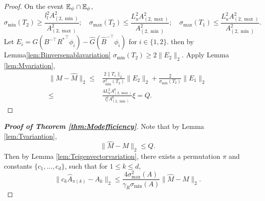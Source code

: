 \begin{proof}
On the event $\mathbb{E}_{\psi}\cap\mathbb{E}_{\phi}$,
\[
\sigma_{\min}(T_2) \ge \frac{l_l^2A^2_{(2,\min)}}{A^2_{(2,\max)}}; \quad \sigma_{\max}(T_2) \le \frac{L_u^2A^2_{(2,\max)}}{A^2_{(2,\min)}};  \quad \sigma_{\max}(T_1) \le \frac{L_u^2A^2_{(2,\max)}}{A^2_{(2,\min)}}. 
\]
Let $E_i = G(B^{-\top}{R^*}^{\top}\phi_i) - \widehat{G}(\widehat{B}^{-\top}\phi_i)$ for  $i\in\{1,2\}$. then by 
Lemma\ref{lem:Binversenablavariation} $\sigma_{\min}(T_2) \ge 2\|E_2\|_2$.
Apply Lemma \ref{lem:Mvariation},
\begin{align*}
\|M - \widehat{M}\|_2 \le &
\frac{2\|T_1\|_2}{\sigma^2_{\min}(T_2)}\|E_2\|_2 + \frac{2}{\sigma_{\min}(T_2)}\|E_1\|_2 \\
\le & \frac{4L_u^2A^6_{(2,\max)}}{l_l^4 A^6_{(2,\min)}}\widehat{\xi} = Q.
\end{align*}
\end{proof}
\begin{proof}[{\bf Proof of Theorem \ref{thm:Modefficiency}}]
Note that by Lemma \ref{lem:Tvariantion},
\[
\|\widehat{M} - M\|_2 \le Q.
\]
Then by Lemma \ref{lem:Teigenvectorvariation}, there exists a permutation $\pi$ and constants $\{c_1,\ldots,c_d\}$, such that for $1\le k\le d$,
\[
\| c_k\widehat{A}_{\pi(k)} - A_k\|_2 \le \frac{4\sigma^2_{\max}(A)}{\gamma_R\sigma_{\min}(A)} \|\widehat{M} - M\|_2.
\]
\end{proof}

